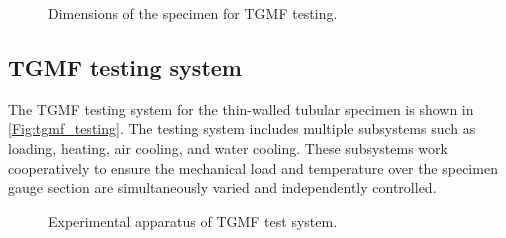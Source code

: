 \documentclass[preprint,5p,twocolumn,11pt,sort&compress]{elsarticle}
\begin{document}
\begin{figure}[!htp]
\caption{Dimensions of the specimen for TGMF testing.}
\label{Fig:IN718_Axial_Specimen_TGMF}
\end{figure}

\subsection{TGMF testing system}
The TGMF testing system for the thin-walled tubular specimen is shown in \autoref{Fig:tgmf_testing}. The testing system includes multiple subsystems such as loading, heating, air cooling, and water cooling. These subsystems work cooperatively to ensure the mechanical load and temperature over the specimen gauge section are simultaneously varied and independently controlled. 
\begin{figure}[!htp]
\caption{Experimental apparatus of TGMF test system.}
\label{Fig:tgmf_testing}
\end{figure}
\end{document}
